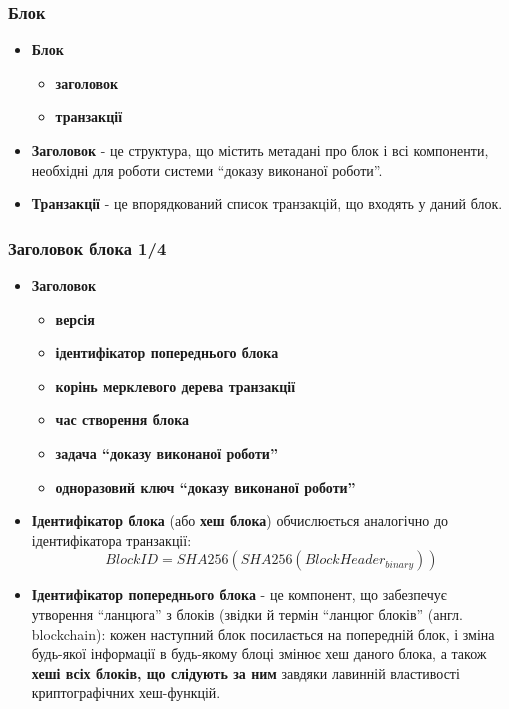 \documentclass{beamer}
\begin{document}
\begin{frame}
  \frametitle{Блок}
  \begin{itemize}
  \item \textbf{Блок}
    \begin{itemize}
    \item \textbf{заголовок}
    \item \textbf{транзакції}
    \end{itemize}
  \item \textbf{Заголовок} - це структура, що містить метадані про блок і всі
    компоненти, необхідні для роботи системи ``доказу виконаної роботи''.
  \item \textbf{Транзакції} - це впорядкований список транзакцій, що входять у
    даний блок.
  \end{itemize}
\end{frame}

\begin{frame}
  \frametitle{Заголовок блока 1/4}
  \begin{itemize}
  \item \textbf{Заголовок}
    \begin{itemize}
    \item \textbf{версія}
    \item \textbf{ідентифікатор попереднього блока}
    \item \textbf{корінь мерклевого дерева транзакції}
    \item \textbf{час створення блока}
    \item \textbf{задача ``доказу виконаної роботи''}
    \item \textbf{одноразовий ключ ``доказу виконаної роботи''}
    \end{itemize}
  \item \textbf{Ідентифікатор блока} (або \textbf{хеш блока}) обчислюється
    аналогічно до ідентифікатора транзакції:
    $$BlockID = SHA256(SHA256(BlockHeader_{binary}))$$
  \item \textbf{Ідентифікатор попереднього блока} - це компонент, що забезпечує
    утворення ``ланцюга'' з блоків (звідки й термін ``ланцюг блоків''
    (англ. blockchain): кожен наступний блок посилається на попередній блок, і
    зміна будь-якої інформації в будь-якому блоці змінює хеш даного блока, а
    також \textbf{хеші всіх блоків, що слідують за ним} завдяки лавинній
    властивості криптографічних хеш-функцій.
  \end{itemize}
\end{frame}
\end{document}
